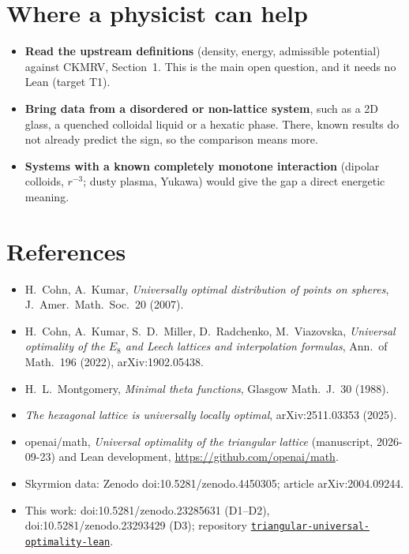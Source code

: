 \documentclass[11pt,a4paper]{article}
\newcommand{\repo}{\href{https://github.com/xaviercallens/triangular-universal-optimality-lean}{\texttt{triangular-universal-optimality-lean}}}
\begin{document}
\section{Where a physicist can help}

\begin{itemize}
\item \textbf{Read the upstream definitions} (density, energy, admissible potential) against CKMRV, Section~1. This is
the main open question, and it needs no Lean (target T1).
\item \textbf{Bring data from a disordered or non-lattice system}, such as a 2D glass, a quenched colloidal liquid or a
hexatic phase. There, known results do not already predict the sign, so the comparison means more.
\item \textbf{Systems with a known completely monotone interaction} (dipolar colloids, $r^{-3}$; dusty plasma, Yukawa)
would give the gap a direct energetic meaning.
\end{itemize}

\section*{References}
\small
\begin{itemize}\setlength\itemsep{0pt}
\item H.~Cohn, A.~Kumar, \emph{Universally optimal distribution of points on spheres}, J.~Amer.\ Math.\ Soc.\ 20 (2007).
\item H.~Cohn, A.~Kumar, S.~D.~Miller, D.~Radchenko, M.~Viazovska, \emph{Universal optimality of the $E_8$ and Leech
lattices and interpolation formulas}, Ann.\ of Math.\ 196 (2022), arXiv:1902.05438.
\item H.~L.~Montgomery, \emph{Minimal theta functions}, Glasgow Math.\ J.\ 30 (1988).
\item \emph{The hexagonal lattice is universally locally optimal}, arXiv:2511.03353 (2025).
\item openai/math, \emph{Universal optimality of the triangular lattice} (manuscript, 2026-09-23) and Lean development,
\url{https://github.com/openai/math}.
\item Skyrmion data: Zenodo doi:10.5281/zenodo.4450305; article arXiv:2004.09244.
\item This work: doi:10.5281/zenodo.23285631 (D1--D2), doi:10.5281/zenodo.23293429 (D3); repository \repo.
\end{itemize}
\end{document}
